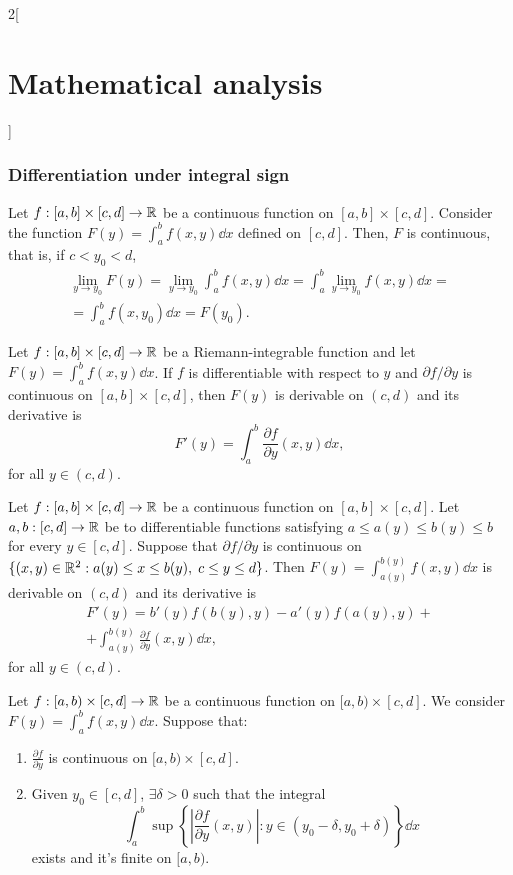 \documentclass[../../../main.tex]{subfiles}
\begin{document}
\begin{multicols}{2}[\section{Mathematical analysis}]
\subsubsection*{Differentiation under integral sign}
\begin{theorem}
Let $f:[a,b]\times[c,d]\rightarrow\mathbb{R} $ be a continuous function on $[a,b]\times[c,d]$. Consider the function $\displaystyle F(y)=\int_a^bf(x,y)\dd x$ defined on $[c,d]$. Then, $F$ is continuous, that is, if $c<y_0<d$, \begin{multline*}
    \lim_{y\to y_0}F(y)=\lim_{y\to y_0}\int_a^bf(x,y)\dd x=\int_a^b\lim_{y\to y_0}f(x,y)\dd x=\\=\int_a^bf(x,y_0)\dd x=F(y_0).
\end{multline*}
\end{theorem}
\begin{theorem}
Let $f:[a,b]\times[c,d]\rightarrow\mathbb{R} $ be a Riemann-integrable function and let $\displaystyle F(y)=\int_a^bf(x,y)\dd x$. If $f$ is differentiable with respect to $y$ and $\partial f/\partial y$ is continuous on $[a,b]\times[c,d]$, then $F(y)$ is derivable on $(c,d)$ and its derivative is $$F'(y)=\int_a^b\frac{\partial f}{\partial y}(x,y)\dd x,$$ for all $y\in(c,d)$.
\end{theorem}
\begin{theorem}
Let $f:[a,b]\times[c,d]\rightarrow\mathbb{R} $ be a continuous function on $[a,b]\times[c,d]$. Let $a,b:[c,d]\rightarrow\mathbb{R} $ be to differentiable functions satisfying $a\leq a(y)\leq b(y)\leq b$ for every $y\in[c,d]$. Suppose that $\partial f/\partial y$ is continuous on $\{(x,y)\in\mathbb{R} ^2:a(y)\leq x\leq b(y),\; c\leq y\leq d\}$. Then $\displaystyle F(y)=\int_{a(y)}^{b(y)}f(x,y)\dd x$ is derivable on $(c,d)$ and its derivative is \begin{multline*}
    F'(y)=b'(y)f(b(y),y)-a'(y)f(a(y),y)+\\+\int_{a(y)}^{b(y)}\frac{\partial f}{\partial y}(x,y)\dd x,
\end{multline*} for all $y\in(c,d)$.
\end{theorem}
\begin{theorem}
Let $f:[a,b)\times[c,d]\rightarrow\mathbb{R} $ be a continuous function on $[a,b)\times[c,d]$. We consider $\displaystyle F(y)=\int_a^bf(x,y)\dd x$. Suppose that: 
\begin{enumerate}
    \item $\displaystyle\frac{\partial f}{\partial y}$ is continuous on $[a,b)\times[c,d]$.
    \item Given $y_0\in[c,d]$, $\exists\delta>0$ such that the integral $$\int_a^b\sup\left\{\left|\frac{\partial f}{\partial y}(x,y)\right|:y\in(y_0-\delta,y_0+\delta)\right\}\dd x$$ exists and it's finite on $[a,b)$.

\end{enumerate}
\end{theorem}
\end{multicols}
\end{document}
